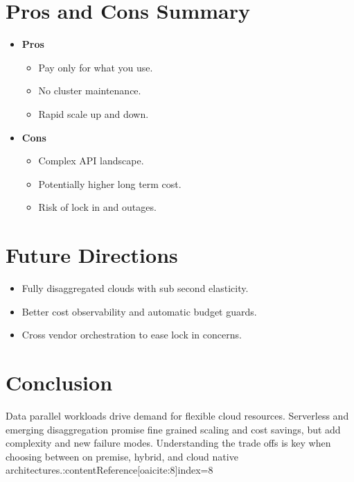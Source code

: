 \documentclass[11pt]{article}
\begin{document}
\section{Pros and Cons Summary}

\begin{itemize}[itemsep=0pt]
  \item \textbf{Pros}
    \begin{itemize}[itemsep=0pt]
      \item Pay only for what you use.
      \item No cluster maintenance.
      \item Rapid scale up and down.
    \end{itemize}
  \item \textbf{Cons}
    \begin{itemize}[itemsep=0pt]
      \item Complex API landscape.
      \item Potentially higher long term cost.
      \item Risk of lock in and outages.
    \end{itemize}
\end{itemize}

\section{Future Directions}

\begin{itemize}[itemsep=0pt]
  \item Fully disaggregated clouds with sub second elasticity.
  \item Better cost observability and automatic budget guards.
  \item Cross vendor orchestration to ease lock in concerns.
\end{itemize}

\section*{Conclusion}

Data parallel workloads drive demand for flexible cloud resources.  Serverless and emerging disaggregation promise fine grained scaling and cost savings, but add complexity and new failure modes.  Understanding the trade offs is key when choosing between on premise, hybrid, and cloud native architectures.:contentReference[oaicite:8]{index=8}
\end{document}
